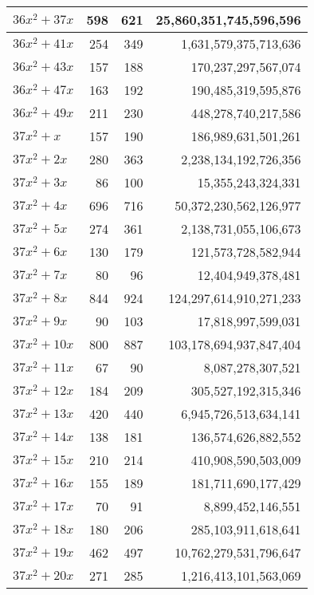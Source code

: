 \documentclass[a4paper]{amsproc}
\theoremstyle{plain}
\theoremstyle{named}
\begin{document}
\begin{longtable}{ | l | r | r | r | }
$36x^2 + 37x$ & 598 & 621 & 25{,}860{,}351{,}745{,}596{,}596 \\ \hline
$36x^2 + 41x$ & 254 & 349 & 1{,}631{,}579{,}375{,}713{,}636 \\ \hline
$36x^2 + 43x$ & 157 & 188 & 170{,}237{,}297{,}567{,}074 \\ \hline
$36x^2 + 47x$ & 163 & 192 & 190{,}485{,}319{,}595{,}876 \\ \hline
$36x^2 + 49x$ & 211 & 230 & 448{,}278{,}740{,}217{,}586 \\ \hline
$37x^2 + x$ & 157 & 190 & 186{,}989{,}631{,}501{,}261 \\ \hline
$37x^2 + 2x$ & 280 & 363 & 2{,}238{,}134{,}192{,}726{,}356 \\ \hline
$37x^2 + 3x$ & 86 & 100 & 15{,}355{,}243{,}324{,}331 \\ \hline
$37x^2 + 4x$ & 696 & 716 & 50{,}372{,}230{,}562{,}126{,}977 \\ \hline
$37x^2 + 5x$ & 274 & 361 & 2{,}138{,}731{,}055{,}106{,}673 \\ \hline
$37x^2 + 6x$ & 130 & 179 & 121{,}573{,}728{,}582{,}944 \\ \hline
$37x^2 + 7x$ & 80 & 96 & 12{,}404{,}949{,}378{,}481 \\ \hline
$37x^2 + 8x$ & 844 & 924 & 124{,}297{,}614{,}910{,}271{,}233 \\ \hline
$37x^2 + 9x$ & 90 & 103 & 17{,}818{,}997{,}599{,}031 \\ \hline
$37x^2 + 10x$ & 800 & 887 & 103{,}178{,}694{,}937{,}847{,}404 \\ \hline
$37x^2 + 11x$ & 67 & 90 & 8{,}087{,}278{,}307{,}521 \\ \hline
$37x^2 + 12x$ & 184 & 209 & 305{,}527{,}192{,}315{,}346 \\ \hline
$37x^2 + 13x$ & 420 & 440 & 6{,}945{,}726{,}513{,}634{,}141 \\ \hline
$37x^2 + 14x$ & 138 & 181 & 136{,}574{,}626{,}882{,}552 \\ \hline
$37x^2 + 15x$ & 210 & 214 & 410{,}908{,}590{,}503{,}009 \\ \hline
$37x^2 + 16x$ & 155 & 189 & 181{,}711{,}690{,}177{,}429 \\ \hline
$37x^2 + 17x$ & 70 & 91 & 8{,}899{,}452{,}146{,}551 \\ \hline
$37x^2 + 18x$ & 180 & 206 & 285{,}103{,}911{,}618{,}641 \\ \hline
$37x^2 + 19x$ & 462 & 497 & 10{,}762{,}279{,}531{,}796{,}647 \\ \hline
$37x^2 + 20x$ & 271 & 285 & 1{,}216{,}413{,}101{,}563{,}069 \\ \hline

\end{longtable}
\end{document}
